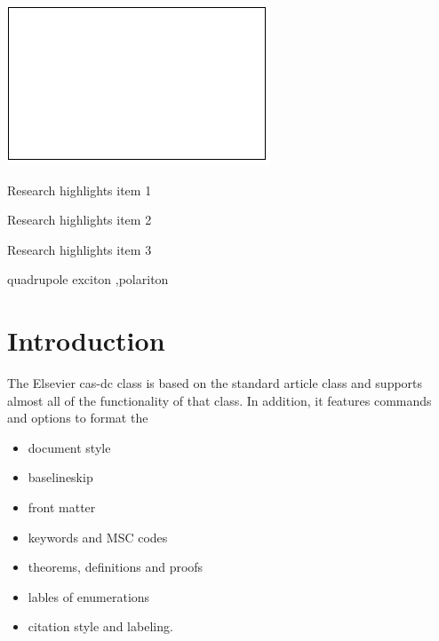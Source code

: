 \documentclass[a4paper,fleqn]{cas-dc}
\begin{document}
\begin{abstract}
This template helps you to create a properly formatted \LaTeX\ manuscript.

\noindent\texttt{\textbackslash begin{abstract}} \dots 
\texttt{\textbackslash end{abstract}} and
\verb+\begin{keyword}+ \verb+...+ \verb+\end{keyword}+ 
which
contain the abstract and keywords respectively. 

\noindent Each keyword shall be separated by a \verb+\sep+ command.
\end{abstract}

\begin{graphicalabstract}
\label{graphicalabstract}
\includegraphics{figs/grabs.pdf}
\end{graphicalabstract}
\clearpage
\begin{highlights}
\label{highLights}
\item Research highlights item 1
\item Research highlights item 2
\item Research highlights item 3
\end{highlights}

\begin{keywords}
quadrupole exciton \sep polariton
\end{keywords}


\maketitle

\section{Introduction}

The Elsevier cas-dc class is based on the
standard article class and supports almost all of the functionality of
that class. In addition, it features commands and options to format the
\begin{itemize} \item document style \item baselineskip \item front
matter \item keywords and MSC codes \item theorems, definitions and
proofs \item lables of enumerations \item citation style and labeling.
\end{itemize}
\end{document}
